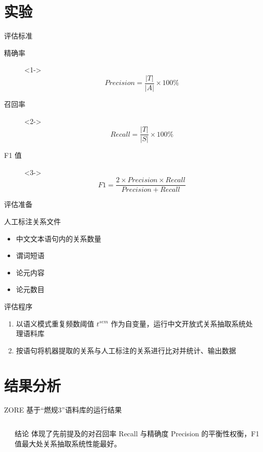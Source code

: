 \documentclass[12pt]{ctexbeamer}	%
\begin{document}

\section{实验}

\begin{frame}{评估标准}
  \begin{description}
    \item[精确率]<1-> $$Precision=\frac{|T|}{|A|}\times 100\%$$
    \item[召回率]<2-> $$Recall=\frac{|T|}{|S|}\times 100\%$$
    \item[F1 值]<3-> $$F1=\frac{2\times Precision\times Recall}{Precision+Recall}$$
  \end{description}
\end{frame}

\begin{frame}{评估准备}
  \begin{block}{人工标注关系文件}
    \begin{itemize}
      \item 中文文本语句内的关系数量
      \item 谓词短语
      \item 论元内容
      \item 论元数目
    \end{itemize}
  \end{block}
\end{frame}

\begin{frame}{评估程序}
    \begin{enumerate}
      \item 以语义模式重复频数阈值 $t^{sem}$ 作为自变量，运行中文开放式关系抽取系统处理语料库
      \item 按语句将机器提取的关系与人工标注的关系进行比对并统计、输出数据
    \end{enumerate}
\end{frame}


\section{结果分析}

\begin{frame}{ZORE 基于“燃规3”语料库的运行结果}
  \begin{columns}
    \begin{column}{0.70\textwidth}
    \end{column}
    \begin{column}{0.30\textwidth}
      \begin{block}{结论}
        体现了先前提及的对召回率 Recall 与精确度 Precision 的平衡性权衡，F1 值最大处关系抽取系统性能最好。
      \end{block}
    \end{column}
  \end{columns}
\end{frame}
\end{document}

